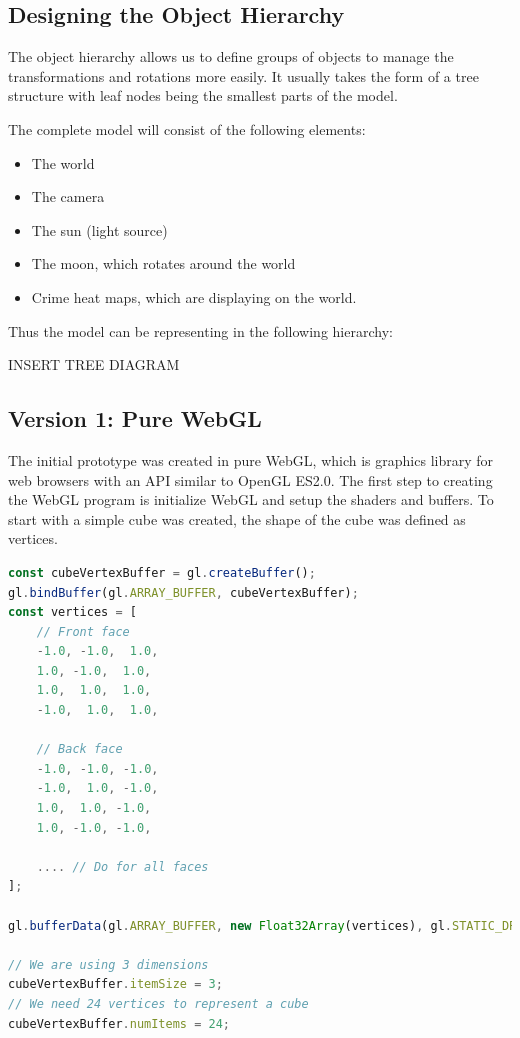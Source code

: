 \documentclass[]{article}
\begin{document}
\subsection{Designing the Object Hierarchy}

The object hierarchy allows us to define groups of objects to manage the transformations and rotations more easily.
It usually takes the form of a tree structure with leaf nodes being the smallest parts of the model.

The complete model will consist of the following elements:

\begin{itemize}
	\item The world
	\item The camera
	\item The sun (light source)
	\item The moon, which rotates around the world
	\item Crime heat maps, which are displaying on the world.
\end{itemize}

Thus the model can be representing in the following hierarchy:

INSERT TREE DIAGRAM

\subsection{Version 1: Pure WebGL}

The initial prototype was created in pure WebGL, which is graphics library for web browsers with an API similar to OpenGL ES2.0.
The first step to creating the WebGL program is initialize WebGL and setup the shaders and buffers.
To start with a simple cube was created, the shape of the cube was defined as vertices.

\begin{lstlisting}[language=JavaScript]
const cubeVertexBuffer = gl.createBuffer();
gl.bindBuffer(gl.ARRAY_BUFFER, cubeVertexBuffer);
const vertices = [
    // Front face
    -1.0, -1.0,  1.0,
    1.0, -1.0,  1.0,
    1.0,  1.0,  1.0,
    -1.0,  1.0,  1.0,

    // Back face
    -1.0, -1.0, -1.0,
    -1.0,  1.0, -1.0,
    1.0,  1.0, -1.0,
    1.0, -1.0, -1.0,

    .... // Do for all faces
];

gl.bufferData(gl.ARRAY_BUFFER, new Float32Array(vertices), gl.STATIC_DRAW);

// We are using 3 dimensions
cubeVertexBuffer.itemSize = 3;
// We need 24 vertices to represent a cube
cubeVertexBuffer.numItems = 24;
\end{lstlisting}
\end{document}
